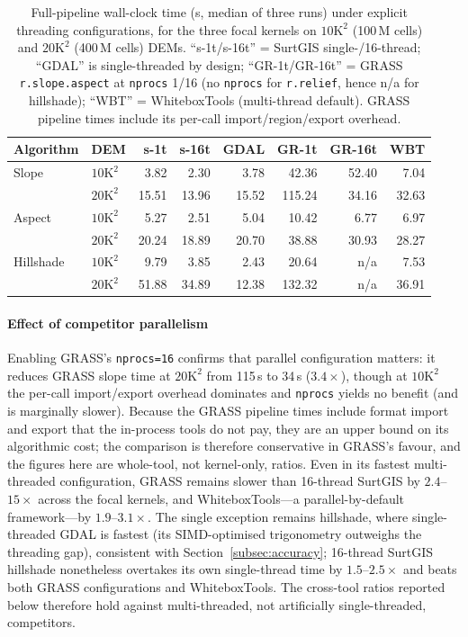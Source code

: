 \documentclass[preprint,review,12pt,authoryear]{elsarticle}
\newif\ifmarkedrev
\newcommand{\revtext}[1]{\ifmarkedrev\textcolor{blue}{#1}\else#1\fi}
\begin{document}
\begin{table}[htbp]
\centering
\caption{\revtext{Full-pipeline wall-clock time (s, median of three runs) under explicit threading configurations, for the three focal kernels on $10\text{K}^2$ (100\,M cells) and $20\text{K}^2$ (400\,M cells) DEMs. ``s-1t/s-16t'' = SurtGIS single-/16-thread; ``GDAL'' is single-threaded by design; ``GR-1t/GR-16t'' = GRASS \texttt{r.slope.aspect} at \texttt{nprocs} 1/16 (no \texttt{nprocs} for \texttt{r.relief}, hence n/a for hillshade); ``WBT'' = WhiteboxTools (multi-thread default). GRASS pipeline times include its per-call import/region/export overhead.}}
\label{tab:threading}
\begin{tabular}{@{}llrrrrrr@{}}
\toprule
Algorithm & DEM & s-1t & s-16t & GDAL & GR-1t & GR-16t & WBT \\
\midrule
Slope     & $10\text{K}^2$ & 3.82  & 2.30  & 3.78  & 42.36 & 52.40 & 7.04 \\
          & $20\text{K}^2$ & 15.51 & 13.96 & 15.52 & 115.24 & 34.16 & 32.63 \\
Aspect    & $10\text{K}^2$ & 5.27  & 2.51  & 5.04  & 10.42 & 6.77  & 6.97 \\
          & $20\text{K}^2$ & 20.24 & 18.89 & 20.70 & 38.88 & 30.93 & 28.27 \\
Hillshade & $10\text{K}^2$ & 9.79  & 3.85  & 2.43  & 20.64 & n/a   & 7.53 \\
          & $20\text{K}^2$ & 51.88 & 34.89 & 12.38 & 132.32 & n/a  & 36.91 \\
\bottomrule
\end{tabular}
\end{table}

\paragraph{\revtext{Effect of competitor parallelism}} \revtext{Enabling GRASS's \texttt{nprocs=16} confirms that parallel configuration matters: it reduces GRASS slope time at $20\text{K}^2$ from 115\,s to 34\,s ($3.4\times$), though at $10\text{K}^2$ the per-call import/export overhead dominates and \texttt{nprocs} yields no benefit (and is marginally slower). Because the GRASS pipeline times include format import and export that the in-process tools do not pay, they are an upper bound on its algorithmic cost; the comparison is therefore conservative in GRASS's favour, and the figures here are whole-tool, not kernel-only, ratios. Even in its fastest multi-threaded configuration, GRASS remains slower than 16-thread SurtGIS by $2.4$--$15\times$ across the focal kernels, and WhiteboxTools---a parallel-by-default framework---by $1.9$--$3.1\times$. The single exception remains hillshade, where single-threaded GDAL is fastest (its SIMD-optimised trigonometry outweighs the threading gap), consistent with Section~\ref{subsec:accuracy}; 16-thread SurtGIS hillshade nonetheless overtakes its own single-thread time by $1.5$--$2.5\times$ and beats both GRASS configurations and WhiteboxTools. The cross-tool ratios reported below therefore hold against multi-threaded, not artificially single-threaded, competitors.}
\end{document}
